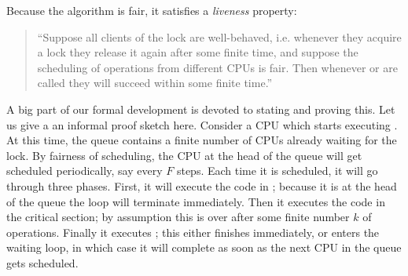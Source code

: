 Because the algorithm is fair, it satisfies a \emph{liveness}
property:\begin{quote}
``Suppose all clients of the lock are well-behaved, i.e. whenever they acquire a lock they release it again after some finite time, and suppose the scheduling of operations from different CPUs is fair. Then  whenever  or  are called they will succeed within some finite time.''
\end{quote}
A big part of our formal development is devoted to stating and proving
this.
Let us give a an informal proof sketch here. 
Consider a CPU which starts executing .
At this time, the queue contains a finite number of CPUs already waiting for the lock.
By fairness of scheduling, the CPU at the head of the queue will get scheduled periodically, say every $F$ steps. Each time it is scheduled, it will go through three phases. 
First, it will execute the code in ; because it is at the head of the queue the loop will terminate immediately. 
Then it executes the code in the critical section; by assumption this is over after some finite number $k$ of operations. 
Finally it executes ; this either finishes immediately, or enters the waiting loop, in which case it will complete as soon as the next CPU in the queue gets scheduled. 





